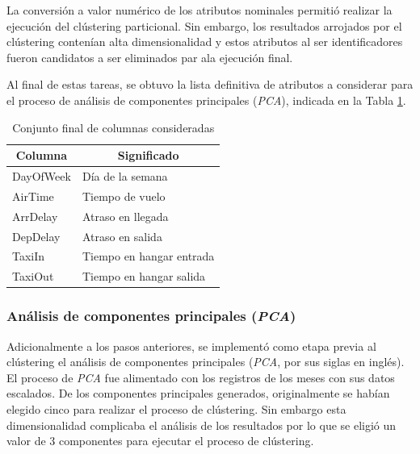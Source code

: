 \documentclass[12pt]{article}
\numberwithin{equation}{section}
\numberwithin{table}{section}
\numberwithin{figure}{section}
\begin{document}
La conversión a valor numérico de los atributos nominales permitió realizar la ejecución del clústering particional.
Sin embargo, los resultados arrojados por el clústering contenían alta dimensionalidad y estos atributos al ser identificadores fueron candidatos a ser eliminados par ala ejecución final.

Al final de estas tareas, se obtuvo la lista definitiva de atributos a considerar para el proceso de análisis de componentes principales (\emph{PCA}), indicada en la Tabla \ref{tbl:conjunto-final-columnas}.
\begin{table}[h]
\begin{tabular}{@{}ll@{}}
\toprule
\multicolumn{1}{c}{\textbf{Columna}} & \multicolumn{1}{c}{\textbf{Significado}} \\ \midrule
DayOfWeek                            & Día de la semana                         \\
AirTime                              & Tiempo de vuelo                          \\
ArrDelay                             & Atraso en llegada                        \\
DepDelay                             & Atraso en salida                         \\
TaxiIn                               & Tiempo en hangar entrada                 \\
TaxiOut                              & Tiempo en hangar salida                  \\ \bottomrule
\end{tabular}
\caption{Conjunto final de columnas consideradas}
\label{tbl:conjunto-final-columnas}
\end{table}

\subsubsection{Análisis de componentes principales (\emph{PCA})}
Adicionalmente a los pasos anteriores, se implementó como etapa previa al clústering el análisis de componentes principales (\emph{PCA}, por sus siglas en inglés).
El proceso de \emph{PCA} fue alimentado con los registros de los meses con sus datos escalados. 
De los componentes principales generados, originalmente se habían elegido cinco para realizar el proceso de clústering. 
Sin embargo esta dimensionalidad complicaba el análisis de los resultados por lo que se eligió un valor de 3 componentes para ejecutar el proceso de clústering.
\end{document}

